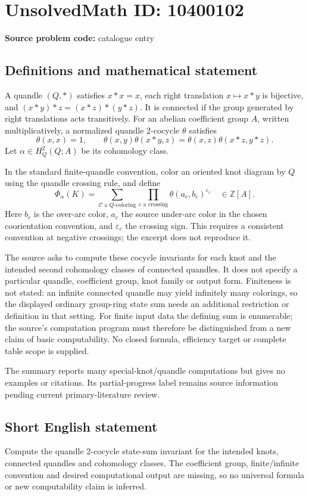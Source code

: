 \documentclass[11pt]{article}
\begin{document}
\section*{UnsolvedMath ID: 10400102}
\textbf{Source problem code:} catalogue entry
\subsection{Definitions and mathematical statement}
A quandle \((Q,*)\) satisfies \(x*x=x\), each right translation \(x\mapsto x*y\) is bijective, and \((x*y)*z=(x*z)*(y*z)\). It is connected if the group generated by right translations acts transitively. For an abelian coefficient group \(A\), written multiplicatively, a normalized quandle 2-cocycle \(\theta\) satisfies
\[
 \theta(x,x)=1,\qquad
 \theta(x,y)\theta(x*y,z)=\theta(x,z)\theta(x*z,y*z).
\]
Let \(\alpha\in H_Q^2(Q;A)\) be its cohomology class.

In the standard finite-quandle convention, color an oriented knot diagram by \(Q\) using the quandle crossing rule, and define
\[
 \Phi_\alpha(K)=\sum_{\mathcal C\text{ a }Q\text{-coloring}}
 \prod_{c\text{ a crossing}}\theta(a_c,b_c)^{\varepsilon_c}
 \quad\in\mathbb Z[A].
\]
Here \(b_c\) is the over-arc color, \(a_c\) the source under-arc color in the chosen coorientation convention, and \(\varepsilon_c\) the crossing sign. This requires a consistent convention at negative crossings; the excerpt does not reproduce it.

The source asks to compute these cocycle invariants for each knot and the intended second cohomology classes of connected quandles. It does not specify a particular quandle, coefficient group, knot family or output form. Finiteness is not stated: an infinite connected quandle may yield infinitely many colorings, so the displayed ordinary group-ring state sum needs an additional restriction or definition in that setting. For finite input data the defining sum is enumerable; the source's computation program must therefore be distinguished from a new claim of basic computability. No closed formula, efficiency target or complete table scope is supplied.

The summary reports many special-knot/quandle computations but gives no examples or citations. Its partial-progress label remains source information pending current primary-literature review.
\subsection{Short English statement}
Compute the quandle 2-cocycle state-sum invariant for the intended knots, connected quandles and cohomology classes. The coefficient group, finite/infinite convention and desired computational output are missing, so no universal formula or new computability claim is inferred.
\end{document}
